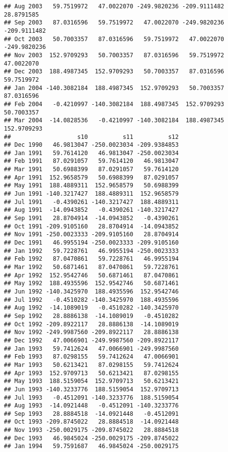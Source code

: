 \documentclass[]{article}
\begin{document}
\begin{verbatim}
## Aug 2003   59.7519972   47.0022070 -249.9820236 -209.9111482   28.8791585
## Sep 2003   87.0316596   59.7519972   47.0022070 -249.9820236 -209.9111482
## Oct 2003   50.7003357   87.0316596   59.7519972   47.0022070 -249.9820236
## Nov 2003  152.9709293   50.7003357   87.0316596   59.7519972   47.0022070
## Dec 2003  188.4987345  152.9709293   50.7003357   87.0316596   59.7519972
## Jan 2004 -140.3082184  188.4987345  152.9709293   50.7003357   87.0316596
## Feb 2004   -0.4210997 -140.3082184  188.4987345  152.9709293   50.7003357
## Mar 2004  -14.0828536   -0.4210997 -140.3082184  188.4987345  152.9709293
##                   s10          s11          s12
## Dec 1990   46.9813047 -250.0023034 -209.9384853
## Jan 1991   59.7614120   46.9813047 -250.0023034
## Feb 1991   87.0291057   59.7614120   46.9813047
## Mar 1991   50.6988399   87.0291057   59.7614120
## Apr 1991  152.9658579   50.6988399   87.0291057
## May 1991  188.4889311  152.9658579   50.6988399
## Jun 1991 -140.3217427  188.4889311  152.9658579
## Jul 1991   -0.4390261 -140.3217427  188.4889311
## Aug 1991  -14.0943852   -0.4390261 -140.3217427
## Sep 1991   28.8704914  -14.0943852   -0.4390261
## Oct 1991 -209.9105160   28.8704914  -14.0943852
## Nov 1991 -250.0023333 -209.9105160   28.8704914
## Dec 1991   46.9955194 -250.0023333 -209.9105160
## Jan 1992   59.7228761   46.9955194 -250.0023333
## Feb 1992   87.0470861   59.7228761   46.9955194
## Mar 1992   50.6871461   87.0470861   59.7228761
## Apr 1992  152.9542746   50.6871461   87.0470861
## May 1992  188.4935596  152.9542746   50.6871461
## Jun 1992 -140.3425970  188.4935596  152.9542746
## Jul 1992   -0.4510282 -140.3425970  188.4935596
## Aug 1992  -14.1089019   -0.4510282 -140.3425970
## Sep 1992   28.8886138  -14.1089019   -0.4510282
## Oct 1992 -209.8922117   28.8886138  -14.1089019
## Nov 1992 -249.9987560 -209.8922117   28.8886138
## Dec 1992   47.0066901 -249.9987560 -209.8922117
## Jan 1993   59.7412624   47.0066901 -249.9987560
## Feb 1993   87.0298155   59.7412624   47.0066901
## Mar 1993   50.6213421   87.0298155   59.7412624
## Apr 1993  152.9709713   50.6213421   87.0298155
## May 1993  188.5159054  152.9709713   50.6213421
## Jun 1993 -140.3233776  188.5159054  152.9709713
## Jul 1993   -0.4512091 -140.3233776  188.5159054
## Aug 1993  -14.0921448   -0.4512091 -140.3233776
## Sep 1993   28.8884518  -14.0921448   -0.4512091
## Oct 1993 -209.8745022   28.8884518  -14.0921448
## Nov 1993 -250.0029175 -209.8745022   28.8884518
## Dec 1993   46.9845024 -250.0029175 -209.8745022
## Jan 1994   59.7591687   46.9845024 -250.0029175

\end{verbatim}
\end{document}
